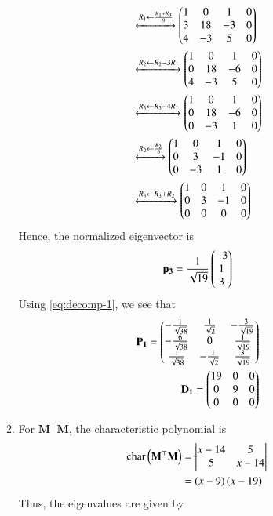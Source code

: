 \documentclass[journal,12pt,twocolumn]{IEEEtran}
\renewcommand{\vec}[1]{\boldsymbol{\mathbf{#1}}}
\begin{document}
\begin{enumerate}
\begin{enumerate}
\begin{align}
            &\xleftrightarrow[]{R_1 \leftarrow \frac{R_1+R_3}{9}} \begin{pmatrix}1&0&1&0\\3&18&-3&0\\4&-3&5&0\end{pmatrix} \\
            &\xleftrightarrow[]{R_2 \leftarrow R_2-3R_1} \begin{pmatrix}1&0&1&0\\0&18&-6&0\\4&-3&5&0\end{pmatrix} \\
            &\xleftrightarrow[]{R_3 \leftarrow R_3-4R_1} \begin{pmatrix}1&0&1&0\\0&18&-6&0\\0&-3&1&0\end{pmatrix} \\
            &\xleftrightarrow[]{R_2 \leftarrow \frac{R_2}{6}} \begin{pmatrix}1&0&1&0\\0&3&-1&0\\0&-3&1&0\end{pmatrix} \\
            &\xleftrightarrow[]{R_3 \leftarrow R_3+R_2} \begin{pmatrix}1&0&1&0\\0&3&-1&0\\0&0&0&0\end{pmatrix}
        \end{align}
        Hence, the normalized eigenvector is
        \begin{align}
            \vec{p_3} = \frac{1}{\sqrt{19}}\myvec{-3\\1\\3}
        \end{align}
        Using \eqref{eq:decomp-1}, we see that
        \begin{align}
            \vec{P_1} = \myvec{-\frac{1}{\sqrt{38}}&\frac{1}{\sqrt{2}}&-\frac{3}{\sqrt{19}}\\-\frac{6}{\sqrt{38}}&0&\frac{1}{\sqrt{19}}\\\frac{1}{\sqrt{38}}&-\frac{1}{\sqrt{2}}&\frac{3}{\sqrt{19}}} \\
            \vec{D_1} = \myvec{19&0&0\\0&9&0\\0&0&0}
            \label{eq:eig-params-1}
        \end{align}
        \item For $\vec{M}^\top\vec{M}$, the characteristic polynomial is
        \begin{align}
            \chr{\vec{M}^\top\vec{M}} &= \mydet{x-14&5\\5&x-14} \\
                                      &= \brak{x-9}\brak{x-19}
                                      \label{eq:char-1}
        \end{align}
        Thus, the eigenvalues are given by

\end{enumerate}
\end{enumerate}
\end{document}
